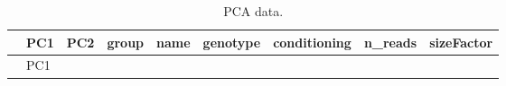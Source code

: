 \documentclass[
  11pt,
]{article}
\begin{document}
\begin{longtable}[]{@{}
  >{\raggedright\arraybackslash}p{}
  >{\raggedleft\arraybackslash}p{}
  >{\raggedleft\arraybackslash}p{}
  >{\raggedright\arraybackslash}p{}
  >{\raggedright\arraybackslash}p{}
  >{\raggedright\arraybackslash}p{}
  >{\raggedright\arraybackslash}p{}
  >{\raggedleft\arraybackslash}p{}
  >{\raggedleft\arraybackslash}p{}@{}}
\caption{PCA data.}\tabularnewline
\toprule\noalign{}
\begin{minipage}[b]{\linewidth}\raggedright
\end{minipage} & \begin{minipage}[b]{\linewidth}\raggedleft
PC1
\end{minipage} & \begin{minipage}[b]{\linewidth}\raggedleft
PC2
\end{minipage} & \begin{minipage}[b]{\linewidth}\raggedright
group
\end{minipage} & \begin{minipage}[b]{\linewidth}\raggedright
name
\end{minipage} & \begin{minipage}[b]{\linewidth}\raggedright
genotype
\end{minipage} & \begin{minipage}[b]{\linewidth}\raggedright
conditioning
\end{minipage} & \begin{minipage}[b]{\linewidth}\raggedleft
n\_reads
\end{minipage} & \begin{minipage}[b]{\linewidth}\raggedleft
sizeFactor
\end{minipage} \\
\midrule\noalign{}
\endfirsthead
\toprule\noalign{}
\begin{minipage}[b]{\linewidth}\raggedright
\end{minipage} & \begin{minipage}[b]{\linewidth}\raggedleft
PC1
\end{minipage} & \begin{minipage}[b]{\linewidth}\raggedleft

\end{minipage}
\end{longtable}
\end{document}
